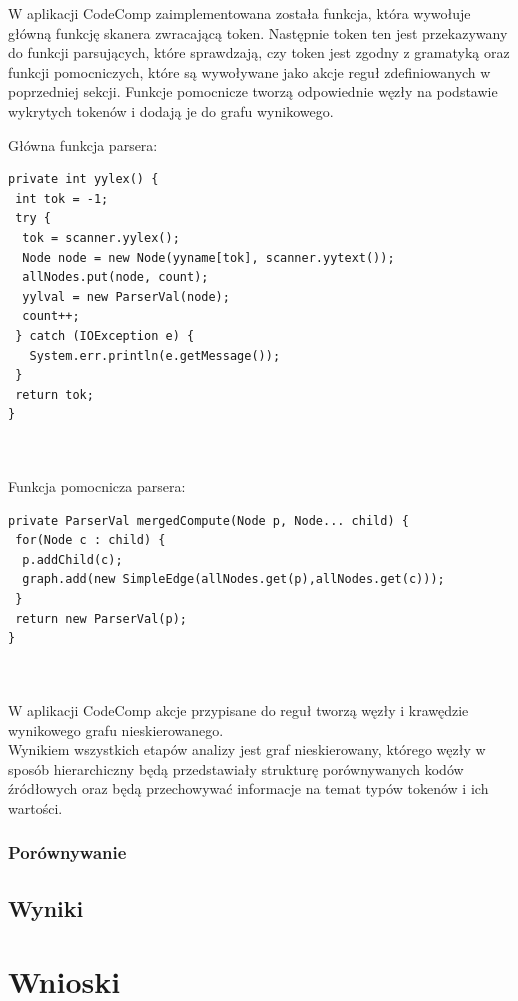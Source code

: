 \documentclass[a4paper,12pt]{article}
\begin{document}
W aplikacji CodeComp zaimplementowana została funkcja, która wywołuje główną funkcję skanera zwracającą token. Następnie token ten jest przekazywany do funkcji parsujących, które sprawdzają, czy token jest zgodny z gramatyką oraz funkcji pomocniczych, które są wywoływane jako akcje reguł zdefiniowanych w poprzedniej sekcji. Funkcje pomocnicze tworzą odpowiednie węzły na podstawie wykrytych tokenów i dodają je do grafu wynikowego.

Główna funkcja parsera:
\begin{lstlisting}
private int yylex() {
 int tok = -1;
 try {
  tok = scanner.yylex();		
  Node node = new Node(yyname[tok], scanner.yytext());
  allNodes.put(node, count);
  yylval = new ParserVal(node);
  count++;
 } catch (IOException e) {
   System.err.println(e.getMessage());
 }
 return tok;
}
\end{lstlisting}
\\ \\

Funkcja pomocnicza parsera:
\begin{lstlisting}
private ParserVal mergedCompute(Node p, Node... child) {
 for(Node c : child) {
  p.addChild(c);
  graph.add(new SimpleEdge(allNodes.get(p),allNodes.get(c)));
 }
 return new ParserVal(p);
}
\end{lstlisting}
\\ \\
W aplikacji CodeComp akcje przypisane do reguł tworzą węzły i krawędzie wynikowego grafu nieskierowanego.
\\


Wynikiem wszystkich etapów analizy jest graf nieskierowany, którego węzły w sposób hierarchiczny będą przedstawiały strukturę porównywanych kodów źródłowych oraz będą przechowywać informacje na temat typów tokenów i ich wartości.

\subsubsection{Porównywanie}

\newpage

\subsection{Wyniki}

\newpage

\section{Wnioski}
\end{document}

